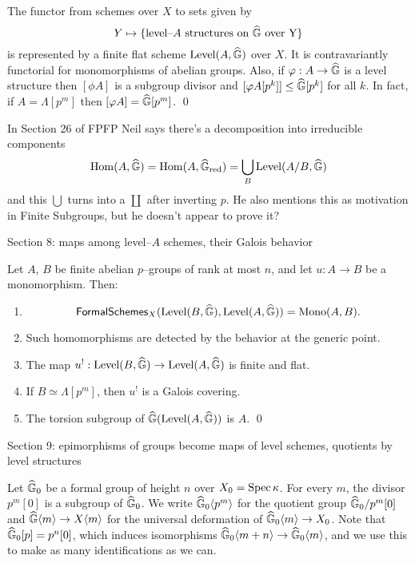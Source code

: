 \begin{lemma}
The functor from schemes over $X$ to sets given by \[Y \mapsto \{\text{level--$A$ structures on $\widehat{\mathbb G}$ over Y}\}\] is represented by a finite flat scheme $\operatorname{Level}(A, \widehat{\mathbb G})$ over $X$.  It is contravariantly functorial for monomorphisms of abelian groups.  Also, if $\varphi: A \to \widehat{\mathbb G}$ is a level structure then $[\phi A]$ is a subgroup divisor and $[\varphi A[p^k]] \le \widehat{\mathbb G}[p^k]$ for all $k$.  In fact, if $A = \Lambda[p^m]$ then $[\varphi A] = \widehat{\mathbb G}[p^m]$.  \qed  {}
\end{lemma}

In Section 26 of FPFP Neil says there's a decomposition into irreducible components \[\operatorname{Hom}(A, \widehat{\mathbb G}) = \operatorname{Hom}(A, \widehat{\mathbb G}_{\mathrm{red}}) = \bigcup_B \operatorname{Level}(A/B, \widehat{\mathbb G})\] and this $\bigcup$ turns into a $\coprod$ after inverting $p$.  He also mentions this as motivation in Finite Subgroups, but he doesn't appear to prove it?

Section 8: maps among level--$A$ schemes, their Galois behavior

\begin{theorem}
Let $A$, $B$ be finite abelian $p$--groups of rank at most $n$, and let $u: A \to B$ be a monomorphism. Then:
\begin{enumerate}
\item \[\mathsf{FormalSchemes}_X(\operatorname{Level}(B, \widehat{\mathbb G}), \operatorname{Level}(A, \widehat{\mathbb G})) = \operatorname{Mono}(A, B).\]
\item Such homomorphisms are detected by the behavior at the generic point.
\item The map $u^!: \operatorname{Level}(B, \widehat{\mathbb G}) \to \operatorname{Level}(A, \widehat{\mathbb G})$ is finite and flat.
\item If $B \simeq \Lambda[p^m]$, then $u^!$ is a Galois covering.
\item The torsion subgroup of $\widehat{\mathbb G}(\operatorname{Level}(A, \widehat{\mathbb G}))$ is $A$. \qed
\end{enumerate}
\end{theorem}

Section 9: epimorphisms of groups become maps of level schemes, quotients by level structures

Let $\widehat{\mathbb G}_0$ be a formal group of height $n$ over $X_0 = \operatorname{Spec} \kappa$.  For every $m$, the divisor $p^m[0]$ is a subgroup of $\widehat{\mathbb G}_0$.  We write $\widehat{\mathbb G}_0\langle p^m\rangle$ for the quotient group $\widehat{\mathbb G}_0 / p^m[0]$ and $\widehat{\mathbb G}\langle m\rangle \to X\langle m\rangle$ for the universal deformation of $\widehat{\mathbb G}_0\langle m\rangle \to X_0$.  Note that $\widehat{\mathbb G}_0[p] = p^n[0]$, which induces isomorphisms $\widehat{\mathbb G}_0\langle m+n\rangle \to \widehat{\mathbb G}_0\langle m\rangle$, and we use this to make as many identifications as we can.

